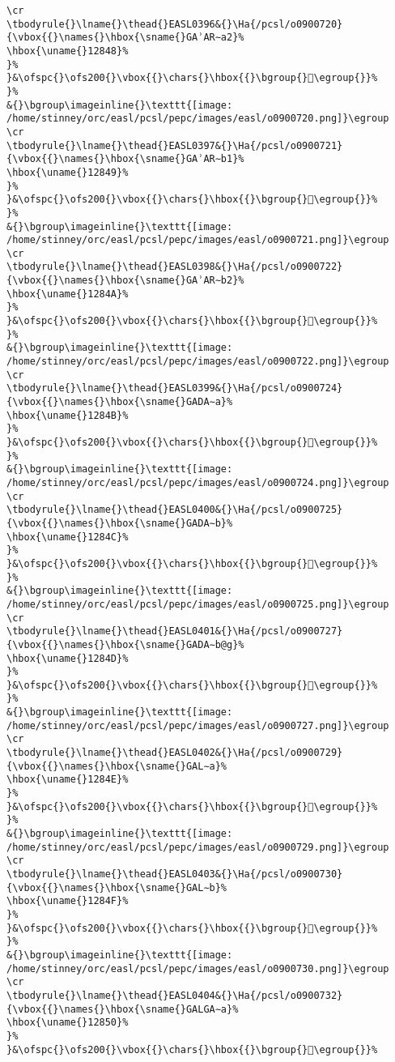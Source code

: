 \begin{verbatim}
\cr
\tbodyrule{}\lname{}\thead{}EASL0396&{}\Ha{/pcsl/o0900720}{\vbox{{}\names{}\hbox{\sname{}GAʾAR∼a2}%
\hbox{\uname{}12848}%
}%
}&\ofspc{}\ofs200{}\vbox{{}\chars{}\hbox{{}\bgroup{}𒡈\egroup{}}%
}%
&{}\bgroup\imageinline{}\texttt{[image: /home/stinney/orc/easl/pcsl/pepc/images/easl/o0900720.png]}\egroup
\cr
\tbodyrule{}\lname{}\thead{}EASL0397&{}\Ha{/pcsl/o0900721}{\vbox{{}\names{}\hbox{\sname{}GAʾAR∼b1}%
\hbox{\uname{}12849}%
}%
}&\ofspc{}\ofs200{}\vbox{{}\chars{}\hbox{{}\bgroup{}𒡉\egroup{}}%
}%
&{}\bgroup\imageinline{}\texttt{[image: /home/stinney/orc/easl/pcsl/pepc/images/easl/o0900721.png]}\egroup
\cr
\tbodyrule{}\lname{}\thead{}EASL0398&{}\Ha{/pcsl/o0900722}{\vbox{{}\names{}\hbox{\sname{}GAʾAR∼b2}%
\hbox{\uname{}1284A}%
}%
}&\ofspc{}\ofs200{}\vbox{{}\chars{}\hbox{{}\bgroup{}𒡊\egroup{}}%
}%
&{}\bgroup\imageinline{}\texttt{[image: /home/stinney/orc/easl/pcsl/pepc/images/easl/o0900722.png]}\egroup
\cr
\tbodyrule{}\lname{}\thead{}EASL0399&{}\Ha{/pcsl/o0900724}{\vbox{{}\names{}\hbox{\sname{}GADA∼a}%
\hbox{\uname{}1284B}%
}%
}&\ofspc{}\ofs200{}\vbox{{}\chars{}\hbox{{}\bgroup{}𒡋\egroup{}}%
}%
&{}\bgroup\imageinline{}\texttt{[image: /home/stinney/orc/easl/pcsl/pepc/images/easl/o0900724.png]}\egroup
\cr
\tbodyrule{}\lname{}\thead{}EASL0400&{}\Ha{/pcsl/o0900725}{\vbox{{}\names{}\hbox{\sname{}GADA∼b}%
\hbox{\uname{}1284C}%
}%
}&\ofspc{}\ofs200{}\vbox{{}\chars{}\hbox{{}\bgroup{}𒡌\egroup{}}%
}%
&{}\bgroup\imageinline{}\texttt{[image: /home/stinney/orc/easl/pcsl/pepc/images/easl/o0900725.png]}\egroup
\cr
\tbodyrule{}\lname{}\thead{}EASL0401&{}\Ha{/pcsl/o0900727}{\vbox{{}\names{}\hbox{\sname{}GADA∼b@g}%
\hbox{\uname{}1284D}%
}%
}&\ofspc{}\ofs200{}\vbox{{}\chars{}\hbox{{}\bgroup{}𒡍\egroup{}}%
}%
&{}\bgroup\imageinline{}\texttt{[image: /home/stinney/orc/easl/pcsl/pepc/images/easl/o0900727.png]}\egroup
\cr
\tbodyrule{}\lname{}\thead{}EASL0402&{}\Ha{/pcsl/o0900729}{\vbox{{}\names{}\hbox{\sname{}GAL∼a}%
\hbox{\uname{}1284E}%
}%
}&\ofspc{}\ofs200{}\vbox{{}\chars{}\hbox{{}\bgroup{}𒡎\egroup{}}%
}%
&{}\bgroup\imageinline{}\texttt{[image: /home/stinney/orc/easl/pcsl/pepc/images/easl/o0900729.png]}\egroup
\cr
\tbodyrule{}\lname{}\thead{}EASL0403&{}\Ha{/pcsl/o0900730}{\vbox{{}\names{}\hbox{\sname{}GAL∼b}%
\hbox{\uname{}1284F}%
}%
}&\ofspc{}\ofs200{}\vbox{{}\chars{}\hbox{{}\bgroup{}𒡏\egroup{}}%
}%
&{}\bgroup\imageinline{}\texttt{[image: /home/stinney/orc/easl/pcsl/pepc/images/easl/o0900730.png]}\egroup
\cr
\tbodyrule{}\lname{}\thead{}EASL0404&{}\Ha{/pcsl/o0900732}{\vbox{{}\names{}\hbox{\sname{}GALGA∼a}%
\hbox{\uname{}12850}%
}%
}&\ofspc{}\ofs200{}\vbox{{}\chars{}\hbox{{}\bgroup{}𒡐\egroup{}}%

\end{verbatim}
